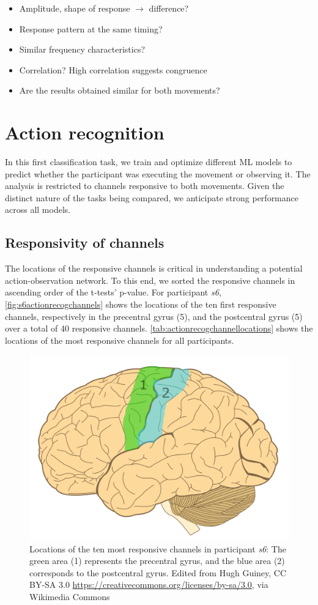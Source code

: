 \documentclass[10pt,conference,compsocconf]{IEEEtran}
\begin{document}
\begin{itemize}
    \item Amplitude, shape of response \(\to\) difference?
    \item Response pattern at the same timing?
    \item Similar frequency characteristics?
    \item Correlation? High correlation suggests congruence
    \item Are the results obtained similar for both movements?
\end{itemize}

\section{Action recognition}
\label{sec:actionrecognition}
In this first classification task, we train and optimize different ML models to predict whether the participant was executing the movement or observing it. The analysis is restricted to channels responsive to both movements. Given the distinct nature of the tasks being compared, we anticipate strong performance across all models.

\subsection{Responsivity of channels}
The locations of the responsive channels is critical in understanding a potential action-observation network. To this end, we sorted the responsive channels in ascending order of the t-tests' p-value. For participant \textit{s6}, \autoref{fig:s6actionrecogchannels} shows the locations of the ten first responsive channels, respectively in the precentral gyrus (5), and the postcentral gyrus (5) over a total of 40 responsive channels. \autoref{tab:actionrecogchannellocations} shows the locations of the most responsive channels for all participants.

\begin{figure}[h!]
    \center
    \includegraphics[width=0.8\linewidth]{images/Human-brain.png}
    \caption{Locations of the ten most responsive channels in participant \textit{s6}: The green area (1) represents the precentral gyrus, and the blue area (2) corresponds to the postcentral gyrus. Edited from Hugh Guiney, CC BY-SA 3.0 \url{https://creativecommons.org/licenses/by-sa/3.0}, via Wikimedia Commons}
    \label{fig:s6actionrecogchannels}
\end{figure}
\FloatBarrier
\end{document}
